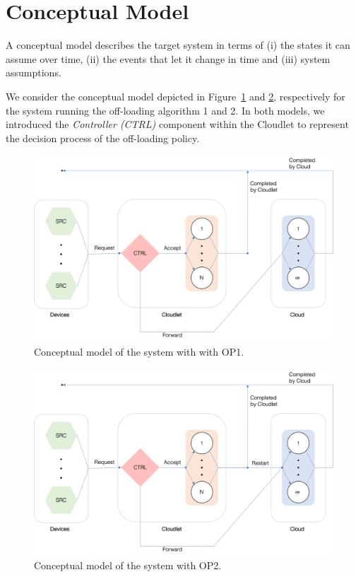 \section{Conceptual Model}
\label{sec:performance-modeling-conceptual-model}
A conceptual model describes the target system in terms of 
(i) the states it can assume over time, 
(ii) the events that let it change in time and
(iii) system assumptions.

We consider the conceptual model depicted in Figure~\ref{fig:conceptual-model-1} and \ref{fig:conceptual-model-2}, respectively for the system running the off-loading algorithm 1 and 2.
In both models, we introduced the \textit{Controller (CTRL)} component within the Cloudlet to represent the decision process of the off-loading policy.

\begin{figure}
	\includegraphics[width=\columnwidth]{fig/conceptual-model-1}
	\caption{Conceptual model of the system with with OP1.}
	\label{fig:conceptual-model-1}
\end{figure}

\begin{figure}
	\includegraphics[width=\columnwidth]{fig/conceptual-model-2}
	\caption{Conceptual model of the system with OP2.}
	\label{fig:conceptual-model-2}
\end{figure}

